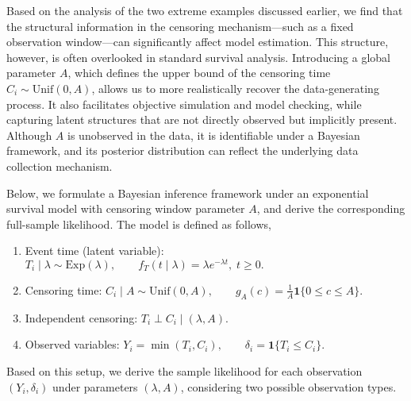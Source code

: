 Based on the analysis of the two extreme examples discussed earlier, we find that the structural information in the censoring mechanism—such as a fixed observation window—can significantly affect model estimation. This structure, however, is often overlooked in standard survival analysis. Introducing a global parameter $A$, which defines the upper bound of the censoring time $C_i \sim \text{Unif}(0, A)$, allows us to more realistically recover the data-generating process. It also facilitates objective simulation and model checking, while capturing latent structures that are not directly observed but implicitly present. Although $A$ is unobserved in the data, it is identifiable under a Bayesian framework, and its posterior distribution can reflect the underlying data collection mechanism.

Below, we formulate a Bayesian inference framework under an exponential survival model with censoring window parameter $A$, and derive the corresponding full-sample likelihood. The model is defined as follows,
\begin{enumerate}
    \item Event time (latent variable): $
    T_i \mid \lambda \sim \mathrm{Exp}(\lambda), 
    \qquad f_T(t \mid \lambda)=\lambda e^{-\lambda t},\; t\ge0.
    $
   \item Censoring time: $
   C_i \mid A \sim \mathrm{Unif}(0,A), 
   \qquad g_A(c)=\tfrac1A \mathbf 1\{0\le c\le A\}.
   $
   \item Independent censoring: $T_i \perp C_i \mid (\lambda, A).$
   \item Observed variables: $ Y_i=\min(T_i,C_i), \qquad 
   \delta_i=\mathbf 1\{T_i\le C_i\}.
   $
\end{enumerate}
Based on this setup, we derive the sample likelihood for each observation $(Y_i, \delta_i)$ under parameters $(\lambda, A)$, considering two possible observation types.

